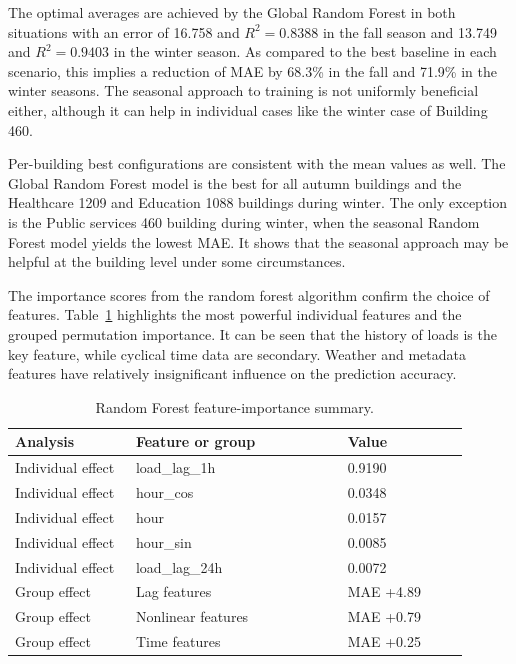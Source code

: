 \documentclass[conference]{IEEEtran}
\begin{document}
The optimal averages are achieved by the Global Random Forest in both situations with an error of 16.758 and $R^2=0.8388$ in the fall season and 13.749 and $R^2=0.9403$ in the winter season. As compared to the best baseline in each scenario, this implies a reduction of MAE by 68.3\% in the fall and 71.9\% in the winter seasons. The seasonal approach to training is not uniformly beneficial either, although it can help in individual cases like the winter case of Building 460.

Per-building best configurations are consistent with the mean values as well. The Global Random Forest model is the best for all autumn buildings and the Healthcare 1209 and Education 1088 buildings during winter. The only exception is the Public services 460 building during winter, when the seasonal Random Forest model yields the lowest MAE. It shows that the seasonal approach may be helpful at the building level under some circumstances.

The importance scores from the random forest algorithm confirm the choice of features. Table~\ref{tab:feature-importance-paper} highlights the most powerful individual features and the grouped permutation importance. It can be seen that the history of loads is the key feature, while cyclical time data are secondary. Weather and metadata features have relatively insignificant influence on the prediction accuracy.

\begin{table}[H]
\centering
\scriptsize
\caption{Random Forest feature-importance summary.}
\label{tab:feature-importance-paper}
\begin{tabular}{p{0.24\linewidth}p{0.42\linewidth}p{0.24\linewidth}}
\hline
\textbf{Analysis} & \textbf{Feature or group} & \textbf{Value} \\
\hline
Individual effect & load\_lag\_1h& 0.9190 \\
Individual effect & hour\_cos& 0.0348 \\
Individual effect & hour& 0.0157 \\
Individual effect & hour\_sin& 0.0085 \\
Individual effect & load\_lag\_24h& 0.0072 \\
Group  effect & Lag features & MAE +4.89 \\
Group  effect & Nonlinear features & MAE +0.79 \\
Group  effect & Time features & MAE +0.25 \\
\hline
\end{tabular}
\end{table}
\end{document}

